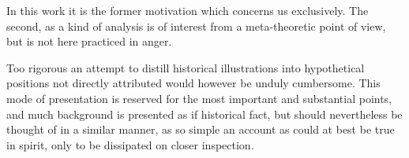 In this work it is the former motivation which concerns us
exclusively.
The second, as a kind of analysis is of interest from a meta-theoretic
point of view, but is not here practiced in anger. 

Too rigorous an attempt to distill historical illustrations into
hypothetical positions not directly attributed would however be unduly
cumbersome.
This mode of presentation is reserved for the most important and
substantial points, and much background is presented as if historical
fact, but should nevertheless be thought of in a similar manner, as so
simple an account as could at best be true in spirit, only to be
dissipated on closer inspection.
